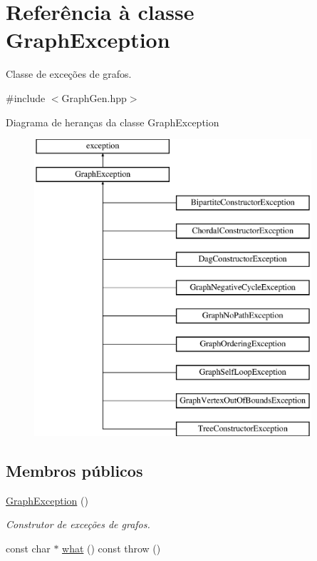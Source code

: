 \hypertarget{classGraphException}{}\section{Referência à classe Graph\+Exception}
\label{classGraphException}


Classe de exceções de grafos.  




{\ttfamily \#include $<$Graph\+Gen.\+hpp$>$}

Diagrama de heranças da classe Graph\+Exception\begin{figure}[H]
\begin{center}
\leavevmode
\includegraphics[height=11.000000cm]{classGraphException}
\end{center}
\end{figure}
\subsection*{Membros públicos}
\begin{DoxyCompactItemize}
\item 
\mbox{\label{classGraphException_aff738f8b56022becfafb28c8cf4efce7}} 
\mbox{\hyperlink{classGraphException_aff738f8b56022becfafb28c8cf4efce7}{Graph\+Exception}} ()
\begin{DoxyCompactList}\small\item\em Construtor de exceções de grafos. \end{DoxyCompactList}\item 
const char $\ast$ \mbox{\hyperlink{classGraphException_ad4368b8af89252086b225cedcfc38639}{what}} () const  throw ()
\end{DoxyCompactItemize}


